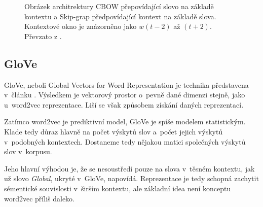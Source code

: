 \begin{figure}[hbt]
	\centering
	\caption{Obrázek architrektury CBOW přepovídající slovo na základě kontextu a Skip-grap předpovídající kontext na základě slova. Kontextové okno je znázorněno jako $w(t-2)$ až $(t+2)$. Převzato z \cite{mikolov2013embeddings}.}
	\label{cbow_and_skipgram}
\end{figure}


\subsection{GloVe}

GloVe, neboli Global Vectors for Word Representation je technika představena v~článku \cite{GloVe}. Výsledkem je vektorový prostor o~pevně dané dimenzi stejně, jako u~word2vec reprezentace. Liší se však způsobem získání daných reprezentací.\par Zatímco word2vec je prediktivní model, GloVe je spíše modelem statistickým. Klade tedy důraz hlavně na počet výskytů slov a~počet jejich výskytů v~podobných kontextech. Dostaneme tedy nějakou matici společných výskytů slov v~korpusu.\par
Jeho hlavní výhodou je, že se nesoustředí pouze na slova v~těsném kontextu, jak už slovo \emph{Global}, ukryté v~GloVe, napovídá. Reprezentace je tedy schopná zachytit sémentické souvislosti v~širším kontextu, ale základní idea není konceptu word2vec příliš daleko.


